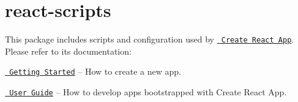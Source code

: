 \chapter{react-\/scripts}
\hypertarget{md_node__modules_2react-scripts_2README}{}\label{md_node__modules_2react-scripts_2README}
\label{md_node__modules_2react-scripts_2README_autotoc_md23011}%
%
 This package includes scripts and configuration used by \href{https://github.com/facebook/create-react-app}{\texttt{ Create React App}}.~\newline
 Please refer to its documentation\+:


\begin{DoxyItemize}
\item \href{https://facebook.github.io/create-react-app/docs/getting-started}{\texttt{ Getting Started}} – How to create a new app.
\item \href{https://facebook.github.io/create-react-app/}{\texttt{ User Guide}} – How to develop apps bootstrapped with Create React App. 
\end{DoxyItemize}